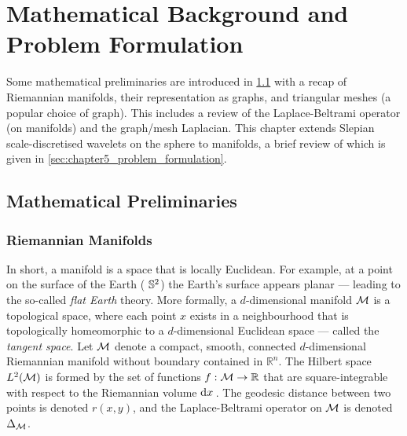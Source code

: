 \section{Mathematical Background and Problem Formulation}\label{sec:chapter5_mathematical_background_problem_formulation}

Some mathematical preliminaries are introduced in \cref{sec:chapter5_mathematical_preliminaries} with a recap of Riemannian manifolds, their representation as graphs, and triangular meshes (a popular choice of graph).
This includes a review of the Laplace-Beltrami operator (on manifolds) and the graph/mesh Laplacian.
This chapter extends Slepian scale-discretised wavelets on the sphere to manifolds, a brief review of which is given in \cref{sec:chapter5_problem_formulation}.

\subsection{Mathematical Preliminaries}\label{sec:chapter5_mathematical_preliminaries}

\subsubsection{Riemannian Manifolds}

In short, a manifold is a space that is locally Euclidean.
For example, at a point on the surface of the Earth (\ie{} \(\mathbb{S}^{2}{}\)) the Earth's surface appears planar --- leading to the so-called \emph{flat Earth} theory.
More formally, a \(d\)-dimensional manifold \(\mathcal{M}{}\) is a topological space, where each point \(x\) exists in a neighbourhood that is topologically homeomorphic to a \(d\)-dimensional Euclidean space --- called the \emph{tangent space}.
Let \(\mathcal{M}{}\) denote a compact, smooth, connected \(d\)-dimensional Riemannian manifold without boundary contained in \(\mathbb{R}^{n}\).
The Hilbert space \(L^{2}(\mathcal{M})\) is formed by the set of functions \(f : \mathcal{M} \to \mathbb{R}\) that are square-integrable with respect to the Riemannian volume \(\dd{x}{}\).
The geodesic distance between two points is denoted \(r(x,y)\), and the Laplace-Beltrami operator on \(\mathcal{M}{}\) is denoted \(\Delta_{\mathcal{M}}\).

